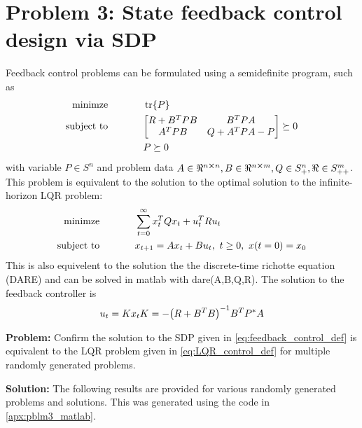 \documentclass[letter]{article}
\begin{document}
\newpage
\section{Problem 3: State feedback control design via SDP}
Feedback control problems can be formulated using a semidefinite program, such as
\begin{equation}\label{eq:feedback_control_def}
	\begin{aligned}
		\text{minimze} \hspace{0.5in}& \trace \{P\}\\
		\text{subject to} \hspace{0.5in}
		& \mqty [R + B^T PB & B^T PA\\
				 A^T PB & Q + A^T P A - P] \succeq 0\\
				 & P \succeq 0
	\end{aligned}
\end{equation}
with variable $P \in S^n$ and problem data $A\in \real^{n\cross n}, B \in\real^{n\cross m}, Q \in S^n_+, \real \in S^m_{++}$.\\

This problem is equivalent to the solution to the optimal solution to the infinite-horizon LQR problem:
\begin{equation}\label{eq:LQR_control_def}
	\begin{aligned}
		\text{minimze} \hspace{0.5in}& \sum_{t=0}^\infty x_t^T Q x_t + u_t^T R u_t\\
		\text{subject to} \hspace{0.5in}
		& x_{t+1} = Ax_t + B u_t, \ t \geq 0, \ x(t=0) = x_0
	\end{aligned}
\end{equation}
This is also equivelent to the solution the the discrete-time richotte equation (DARE) and can be solved in matlab with dare(A,B,Q,R). The solution to the feedback controller is
\begin{equation}\label{eq:LQR_control_solution}
	u_t = K x_t\\
	K = -\qty(R + B^T B)^{-1} B^T P^* A
\end{equation}

\textbf{Problem:}
Confirm the solution to the SDP given in \eqref{eq:feedback_control_def} is equivalent to the LQR problem given in \eqref{eq:LQR_control_def} for multiple randomly generated problems.

\textbf{Solution:}
The following results are provided for various randomly generated problems and solutions. This was generated using the code in \appendixname \ref{apx:pblm3_matlab}.
\end{document}
